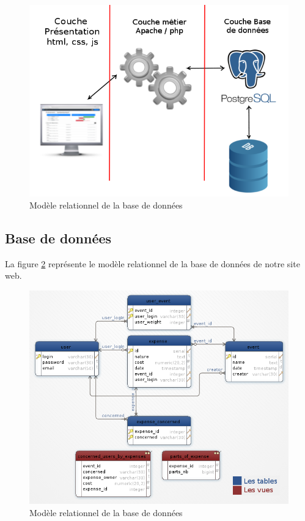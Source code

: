 \documentclass[a4paper, 11pt]{article}
\begin{document}
\begin{figure}[!ht]
	\includegraphics[scale=.9]{images/architecture.png}
	\caption{Modèle relationnel de la base de données}
	\label{fig:architecture}
\end{figure}

\subsection{Base de données}
La figure \ref{fig:model_db} représente le modèle relationnel de la base de données de notre site web.
\begin{figure}[!ht]
	\includegraphics[scale=.8]{images/db.png}
	\caption{Modèle relationnel de la base de données}
	\label{fig:model_db}
\end{figure}
\end{document}
